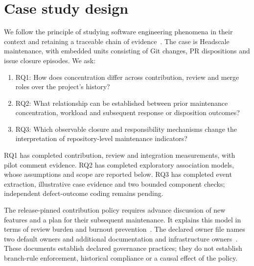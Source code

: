 \documentclass[11pt]{article}
\begin{document}
\section{Case study design}
We follow the principle of studying software engineering phenomena in their
context and retaining a traceable chain of evidence~\cite{runeson2009case}.
The case is Headscale maintenance, with embedded units consisting of Git changes,
PR dispositions and issue closure episodes. We ask:
\begin{enumerate}
\item RQ1: How does concentration differ across contribution, review and merge
roles over the project's history?
\item RQ2: What relationship can be established between prior maintenance
concentration, workload and subsequent response or disposition outcomes?
\item RQ3: Which observable closure and responsibility mechanisms change the
interpretation of repository-level maintenance indicators?
\end{enumerate}
RQ1 has completed contribution, review and integration measurements, with pilot
comment evidence. RQ2 has completed exploratory association models, whose
assumptions and scope are reported below.
RQ3 has completed event extraction, illustrative case evidence and two bounded
component checks; independent
defect-outcome coding remains pending.

The release-pinned contribution policy requires advance discussion of new
features and a plan for their subsequent maintenance. It explains this model
in terms of review burden and burnout prevention~\cite{headscale_contributing}.
The declared owner file names two default owners and additional documentation
and infrastructure owners~\cite{headscale_owners}. These documents establish
declared governance practices; they do not establish branch-rule enforcement,
historical compliance or a causal effect of the policy.
\end{document}
